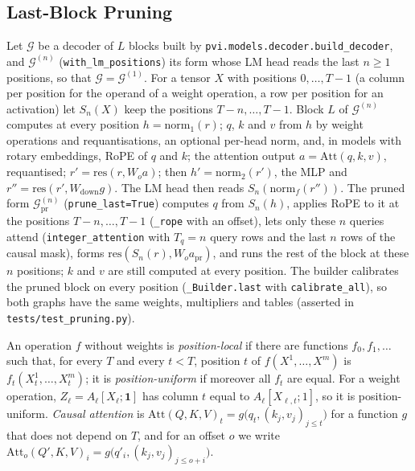 \subsection{Last-Block Pruning}
\label{app:prune}

 Let $\mathcal G$ be a decoder of $L$ blocks built by
\texttt{pvi.models.decoder.build\_decoder}, and $\mathcal G^{(n)}$ (\texttt{with\_lm\_positions}) its
form whose LM head reads the last $n\ge1$ positions, so that $\mathcal G=\mathcal G^{(1)}$. For a
tensor $X$ with positions $0,\dots,T-1$ (a column per position for the operand of a weight
operation, a row per position for an activation) let $S_n(X)$ keep the positions $T-n,\dots,T-1$.
Block $L$ of $\mathcal G^{(n)}$ computes at every position $h=\mathrm{norm}_1(r)$; $q$, $k$ and $v$
from $h$ by weight operations and requantisations, an optional per-head norm, and, in models with
rotary embeddings, RoPE of $q$ and $k$; the attention output $a=\mathrm{Att}(q,k,v)$, requantised; $r'=\mathrm{res}(r,W_o a)$; then
$h'=\mathrm{norm}_2(r')$, the MLP and $r''=\mathrm{res}(r',W_{\mathrm{down}}g)$. The LM head then
reads $S_n(\mathrm{norm}_f(r''))$. The pruned form $\mathcal G^{(n)}_{\mathrm{pr}}$
(\texttt{prune\_last=True}) computes $q$ from $S_n(h)$, applies RoPE to it at the positions
$T-n,\dots,T-1$ (\texttt{\_rope} with an offset), lets only these $n$ queries attend
(\texttt{integer\_attention} with $T_q=n$ query rows and the last $n$ rows of the causal mask), forms
$\mathrm{res}(S_n(r),W_o a_{\mathrm{pr}})$, and runs the rest of the block at these $n$ positions;
$k$ and $v$ are still computed at every position. The builder calibrates the pruned block on every
position (\texttt{\_Builder.last} with \texttt{calibrate\_all}), so both graphs have the same
weights, multipliers and tables (asserted in \texttt{tests/test\_pruning.py}).

\begin{definition}
An operation $f$ without weights is \emph{position-local} if there are functions $f_0,f_1,\dots$
such that, for every $T$ and every $t<T$, position $t$ of $f(X^1,\dots,X^m)$ is
$f_t(X^1_t,\dots,X^m_t)$; it is \emph{position-uniform} if moreover all $f_t$ are equal. For a
weight operation, $Z_\ell=A_\ell[X_\ell;\mathbf 1]$ has column $t$ equal to $A_\ell[X_{\ell,t};1]$,
so it is position-uniform. \emph{Causal attention} is
$\mathrm{Att}(Q,K,V)_t=g\big(q_t,(k_j,v_j)_{j\le t}\big)$ for a function $g$ that does not depend on
$T$, and for an offset $o$ we write $\mathrm{Att}_o(Q',K,V)_i=g\big(q'_i,(k_j,v_j)_{j\le o+i}\big)$.
\end{definition}

